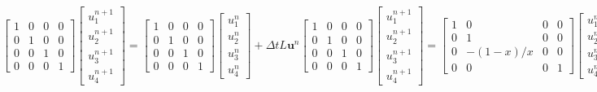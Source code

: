 \begin{subequations}
\begin{equation}\label{eq:C3_euelrMethodBefore}
	\begin{bmatrix}
	1 & 0 & 0 & 0 \\
	0 & 1 & 0 & 0 \\
	0 & 0 & 1 & 0 \\
	0 & 0 & 0 & 1
	\end{bmatrix}
	\begin{bmatrix}
	u_1^{n+1} \\
	u_2^{n+1} \\
	u_3^{n+1} \\
	u_4^{n+1}
	\end{bmatrix}
	=
	\begin{bmatrix}
	1 & 0 & 0 & 0 \\
	0 & 1 & 0 & 0 \\
	0 & 0 & 1 & 0 \\
	0 & 0 & 0 & 1
	\end{bmatrix}
	\begin{bmatrix}
	u_1^{n} \\
	u_2^{n} \\
	u_3^{n} \\
	u_4^{n}
	\end{bmatrix}
	+ 
	\Delta t L \mathbf{u}^n
\end{equation}
\begin{equation}\label{eq:C3_euelrMethodAfter}
	\begin{bmatrix}
	1 & 0 & 0 & 0 \\
	0 & 1 & 0 & 0 \\
	0 & 0 & 1 & 0 \\
	0 & 0 & 0 & 1
	\end{bmatrix}
	\begin{bmatrix}
	u_1^{n+1} \\
	u_2^{n+1} \\
	u_3^{n+1} \\
	u_4^{n+1}
	\end{bmatrix}
	=
	\begin{bmatrix}
	1 & 0 & 0 & 0 \\
	0 & 1 & 0 & 0 \\
	0 & -(1-x)/x & 0 & 0 \\
	0 & 0 & 0 & 1
	\end{bmatrix}
	\begin{bmatrix}
	u_1^{n} \\
	u_2^{n} \\
	u_3^{n} \\
	u_4^{n}
	\end{bmatrix}
	+ 
	\Delta t L' \mathbf{u}^n
\end{equation}
\end{subequations}

